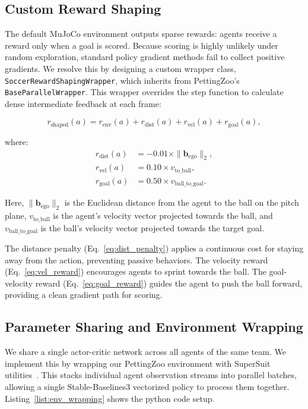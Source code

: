\subsection{Custom Reward Shaping}
\label{sec:rw_shaping}

The default MuJoCo environment outputs sparse rewards: agents receive a reward only when a goal is scored. Because scoring is highly unlikely under random exploration, standard policy gradient methods fail to collect positive gradients. We resolve this by designing a custom wrapper class, \texttt{SoccerRewardShapingWrapper}, which inherits from PettingZoo's \texttt{BaseParallelWrapper}. This wrapper overrides the step function to calculate dense intermediate feedback at each frame:

\begin{equation}
    r_{\text{shaped}}(a) = r_{\text{env}}(a) + r_{\text{dist}}(a) + r_{\text{vel}}(a) + r_{\text{goal}}(a),
    \label{eq:total_reward}
\end{equation}

where:
\begin{align}
    r_{\text{dist}}(a) &= -0.01 \times \|\mathbf{b}_{\text{ego}}\|_2, \label{eq:dist_penalty} \\
    r_{\text{vel}}(a)  &= 0.10 \times v_{\text{to\_ball}}, \label{eq:vel_reward} \\
    r_{\text{goal}}(a) &= 0.50 \times v_{\text{ball\_to\_goal}}. \label{eq:goal_reward}
\end{align}

Here, $\|\mathbf{b}_{\text{ego}}\|_2$ is the Euclidean distance from the agent to the ball on the pitch plane, $v_{\text{to\_ball}}$ is the agent's velocity vector projected towards the ball, and $v_{\text{ball\_to\_goal}}$ is the ball's velocity vector projected towards the target goal. 

The distance penalty (Eq.~\eqref{eq:dist_penalty}) applies a continuous cost for staying away from the action, preventing passive behaviors. The velocity reward (Eq.~\eqref{eq:vel_reward}) encourages agents to sprint towards the ball. The goal-velocity reward (Eq.~\eqref{eq:goal_reward}) guides the agent to push the ball forward, providing a clean gradient path for scoring.

\subsection{Parameter Sharing and Environment Wrapping}

We share a single actor-critic network across all agents of the same team. We implement this by wrapping our PettingZoo environment with SuperSuit utilities~\citep{supersuit2021}. This stacks individual agent observation streams into parallel batches, allowing a single Stable-Baselines3 vectorized policy to process them together. Listing~\ref{list:env_wrapping} shows the python code setup.

